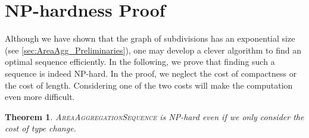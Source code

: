 \documentclass[acmsmall,natbib=false]{acmart}
\begin{document}
\section{NP-hardness Proof}
\label{sec:AreaAgg_NP-hardness}

Although we have shown that the graph of subdivisions
has an exponential size
(see \sect\ref{sec:AreaAgg_Preliminaries}),
one may develop a clever algorithm 
to find an optimal sequence efficiently.
In the following, we prove that 
finding such a sequence is indeed NP-hard.
In the proof, we neglect the cost of compactness or the cost of length.
Considering one of the two costs 
will make the computation even more difficult.


\newtheorem{thm}{Theorem}
\begin{thm}
\textsc{AreaAggregationSequence} is NP-hard 
even if we only consider the cost of type change.
\end{thm}
\end{document}
